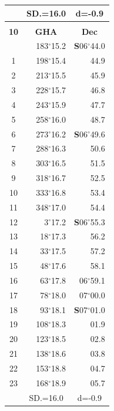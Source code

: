 \documentclass[10pt, a4paper]{report}
\begin{document}
\begin{scriptsize}
\begin{tabular*}{0.2\textwidth}[t]{@{\extracolsep{\fill}}|c|rr|}
\hline
\rule{0pt}{2.4ex} & \multicolumn{1}{c}{SD.=16.0} & \multicolumn{1}{c|}{d=-0.9}\\
\hline
\multicolumn{1}{c}{}\\[-0.5ex]\hline
\multicolumn{1}{|c|}{\rule{0pt}{2.6ex}\textbf{10}} & \multicolumn{1}{c}{\textbf{GHA}} & \multicolumn{1}{c|}{\textbf{Dec}}\\
\hline\rule{0pt}{2.6ex}\noindent
0 & 183$^\circ$15.2 & \textbf{S}06$^\circ$44.0\\
1 & 198$^\circ$15.4 & 44.9\\
2 & 213$^\circ$15.5 & 45.9\\
3 & 228$^\circ$15.7 & \raisebox{0.24ex}{\boldmath$\cdot$~\boldmath$\cdot$~~}46.8\\
4 & 243$^\circ$15.9 & 47.7\\
5 & 258$^\circ$16.0 & 48.7\\[2Pt]
6 & 273$^\circ$16.2 & \textbf{S}06$^\circ$49.6\\
7 & 288$^\circ$16.3 & 50.6\\
8 & 303$^\circ$16.5 & 51.5\\
9 & 318$^\circ$16.7 & \raisebox{0.24ex}{\boldmath$\cdot$~\boldmath$\cdot$~~}52.5\\
10 & 333$^\circ$16.8 & 53.4\\
11 & 348$^\circ$17.0 & 54.4\\[2Pt]
12 & 3$^\circ$17.2 & \textbf{S}06$^\circ$55.3\\
13 & 18$^\circ$17.3 & 56.2\\
14 & 33$^\circ$17.5 & 57.2\\
15 & 48$^\circ$17.6 & \raisebox{0.24ex}{\boldmath$\cdot$~\boldmath$\cdot$~~}58.1\\
16 & 63$^\circ$17.8 & 06$^\circ$59.1\\
17 & 78$^\circ$18.0 & 07$^\circ$00.0\\[2Pt]
18 & 93$^\circ$18.1 & \textbf{S}07$^\circ$01.0\\
19 & 108$^\circ$18.3 & 01.9\\
20 & 123$^\circ$18.5 & 02.8\\
21 & 138$^\circ$18.6 & \raisebox{0.24ex}{\boldmath$\cdot$~\boldmath$\cdot$~~}03.8\\
22 & 153$^\circ$18.8 & 04.7\\
23 & 168$^\circ$18.9 & 05.7\\
\hline
\rule{0pt}{2.4ex} & \multicolumn{1}{c}{SD.=16.0} & \multicolumn{1}{c|}{d=-0.9}\\
\hline
\end{tabular*}\noindent

\end{scriptsize}
\end{document}
